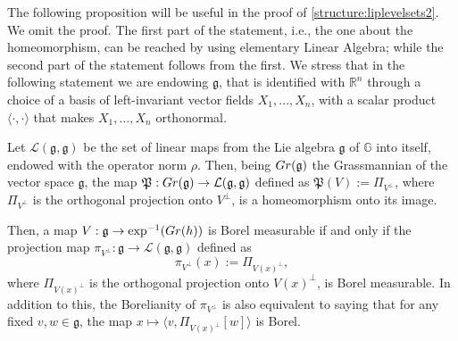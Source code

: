 \documentclass[10pt, a4paper,
oneside, headinclude,footinclude]{scrartcl}
\begin{document}
The following proposition will be useful in the proof of \cref{structure:liplevelsets2}. We omit the proof. The first part of the statement, i.e., the one about the homeomorphism, can be reached by using elementary Linear Algebra; while the second part of the statement follows from the first. We stress that in the following statement we are endowing $\mathfrak g$, that is identified with $\mathbb R^n$ through a choice of a basis of left-invariant vector fields $X_1,\dots,X_n$, with a scalar product $\langle\cdot,\cdot\rangle$ that makes $X_1,\dots,X_n$ orthonormal. 
\begin{proposizione}\label{prop:projmap}
Let $\mathcal{L}(\mathfrak g,\mathfrak g)$ be the set of linear maps from the Lie algebra $\mathfrak g$ of $\mathbb G$ into itself, endowed with the operator norm $\rho$. Then, being $Gr(\mathfrak g)$ the Grassmannian of the vector space $\mathfrak g$, the map $\mathfrak P:Gr(\mathfrak g)\to \mathcal{L}(\mathfrak g,\mathfrak g)$ defined as $\mathfrak P(V):=\Pi_{V^\perp}$, where $\Pi_{V^\perp}$ is the orthogonal projection onto $V^\perp$, is a homeomorphism onto its image.

Then, a map $V:\mathfrak g\to \exp^{-1}(Gr(h))$ is Borel measurable if and only if the projection map $\pi_{V^\perp}:\mathfrak g\to\mathcal{L}(\mathfrak g,\mathfrak g)$  defined as
$$\pi_{V^\perp}(x):=\Pi_{V(x)^\perp},$$
where $\Pi_{V(x)^\perp}$ is the orthogonal projection onto $V(x)^\perp$, is Borel measurable.
In addition to this, the Borelianity of $\pi_{V^\perp}$ is also equivalent to saying that  for any fixed $v,w\in \mathfrak g$, the map $x\mapsto \langle v,\Pi_{V(x)^\perp}[w]\rangle$ is Borel.
\end{proposizione}


\end{document}
